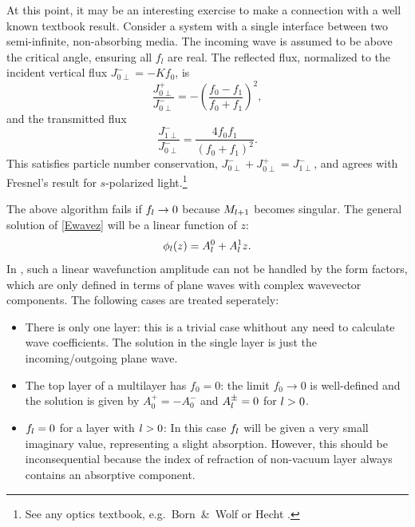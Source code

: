 At this point,
it may be an interesting exercise to make
 a connection with a well known textbook result.
Consider a system
with a single interface between two semi-infinite,
non-absorbing media. The incoming wave is assumed to be above the
critical angle, ensuring all $f_l$ are real.
The reflected flux,
normalized to the incident vertical flux $J_{0\perp}^-=-Kf_0$,
is
%
\begin{equation}
  \frac{J_{0\perp}^+}{J_{0\perp}^-}
  = - \left(\frac{f_0-f_1}{f_0+f_1}\right)^2,
\end{equation}
and the transmitted flux
%
\begin{equation}
  \frac{J_{1\perp}^-}{J_{0\perp}^-}
  = \frac{4f_0 f_1}{(f_0+f_1)^2}.
\end{equation}
This satisfies particle number conservation, $J_{0\perp}^-+J_{0\perp}^+=J_{1\perp}^-$,
and agrees with Fresnel's result for $s$-polarized light.\footnote
{See any optics textbook, e.g.\ Born~\&~Wolf \cite[ch.~1.5.2]{BoWo99}
  or Hecht \cite[ch.~4.6.2]{Hec02}.}

The above algorithm fails if $f_{l}\to0$
because $M_{l+1}$ becomes singular.
The general solution of \cref{Ewavez} will be a linear function of $z$:
\begin{equation}
  \phi_{l}(z) = A^0_{l} + A^1_{l}z.
\end{equation}
In \BornAgain, such a linear wavefunction amplitude can not be handled by the form factors,
which are only defined in terms of plane waves with complex wavevector components.
The following cases are treated seperately:
\begin{itemize}
  \item There is only one layer: this is a trivial case whithout any need to calculate wave coefficients.
    The solution in the single layer is just the incoming/outgoing plane wave.
  \item The top layer of a multilayer has $f_0=0$: the limit $f_0\to0$ is well-defined and the
    solution is given by $A^+_0 = -A^-_0$ and $A^{\pm}_{l}=0$ for $l>0$.
  \item $f_{l}=0$ for a layer with $l>0$: In this case $f_{l}$ will be given a very small imaginary value,
    representing a slight absorption. However, this should be inconsequential because the index of refraction
    of non-vacuum layer always contains an absorptive component.
\end{itemize}


